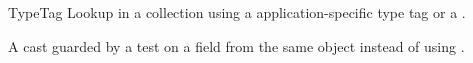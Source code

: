 
\begin{pattern}{TypeTag}
Lookup in a collection using a application-specific type tag or a
.

A cast guarded by a test on a field from the same object instead of
using .

\end{pattern}
